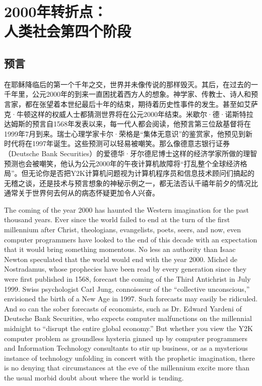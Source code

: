 \chapter[人类社会第四个阶段]{2000年转折点：\\人类社会第四个阶段}

\section{预言}

\begin{paracol}{2}[]
在耶稣降临后的第一个千年之交，世界并未像传说的那样毁灭。其后，在过去的一千年里，公元2000年的到来一直困扰着西方人的想象。神学家、传教士、诗人和预言家，都在张望着本世纪最后十年的结束，期待着历史性事件的发生。甚至如艾萨克·牛顿这样的权威人士都猜测世界将在公元2000年结束。米歇尔·德·诺斯特拉达姆斯的预言自1568年发表以来，每一代人都会阅读，他预言第三位敌基督将在1999年7月到来。瑞士心理学家卡尔·荣格是“集体无意识”的鉴赏家，他预见到新时代将在1997年诞生。这些预测可以轻易被嘲笑。那么像德意志银行证券（Deutsche Bank Securities）的爱德华·牙尔德尼博士这样的经济学家所做的理智预测也会被嘲笑，他认为公元2000年的午夜计算机故障将“打乱整个全球经济格局”。但无论你是否把Y2K计算机问题视为计算机程序员和信息技术顾问们搞起的无稽之谈，还是技术与预言想象的神秘示例之一，都无法否认千禧年前夕的情况比通常关于世界何去何从的病态怀疑更加令人兴奋。
  
\switchcolumn
The coming of the year 2000 has haunted the Western imagination for the past thousand years. Ever since the world failed to end at the turn of the first millennium after Christ, theologians, evangelists, poets, seers, and now, even computer programmers have looked to the end of this decade with an expectation that it would bring something momentous. No less an authority than Isaac Newton speculated that the world would end with the year 2000. Michel de Nostradamus, whose prophecies have been read by every generation since they were first published in 1568, forecast the coming of the Third Antichrist in July 1999. Swiss psychologist Carl Jung, connoisseur of the ``collective unconscious,'' envisioned the birth of a New Age in 1997. Such forecasts may easily be ridiculed. And so can the sober forecasts of economists, such as Dr. Edward Yardeni of Deutsche Bank Securities, who expects computer malfunctions on the millennial midnight to ``disrupt the entire global economy.'' But whether you view the Y2K computer problem as groundless hysteria ginned up by computer programmers and Information Technology consultants to stir up business, or as a mysterious instance of technology unfolding in concert with the prophetic imagination, there is no denying that circumstances at the eve of the millennium excite more than the usual morbid doubt about where the world is tending.


\end{paracol}
